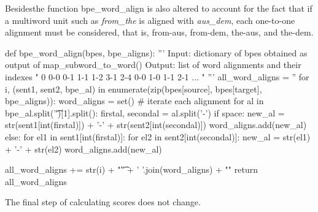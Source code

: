 Besidesthe function bpe\_word\_align is also altered to account for the fact that if a multiword unit such as \emph{from\_the} is aligned with \emph{aus\_dem}, each one-to-one alignment must be considered, that is, from-aus, from-dem, the-aus, and the-dem.

\begin{python}

def bpe_word_align(bpes, bpe_aligns):
  '''
  Input: dictionary of bpes obtained as output of map_subword_to_word()
  Output: list of word alignments and their indexes
    "
      0   0-0 0-1 1-1 1-2 3-1 2-4    0-0 1-0 1-1 2-1 \n
      ...
    "
  '''
  all_word_aligns = ''
  for i, (sent1, sent2, bpe_al) in enumerate(zip(bpes[source], bpes[target], bpe_aligns)):
    word_aligns = set()
    # iterate each alignment
    for al in bpe_al.split('\t')[1].split():
      firstal, secondal = al.split('-')
      if space:
        new_al = str(sent1[int(firstal)]) + '-' + str(sent2[int(secondal)])
        word_aligns.add(new_al)
      else:
        for el1 in sent1[int(firstal)]:
          for el2 in sent2[int(secondal)]:
            new_al = str(el1) + '-' + str(el2)
            word_aligns.add(new_al)

    all_word_aligns += str(i) + "\t" + ' '.join(word_aligns) + "\n"
  return all_word_aligns
\end{python}

The final step of calculating scores does not change.

\begin{python}

\end{python}
